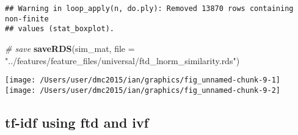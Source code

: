 \documentclass[10pt]{report}
\newenvironment{Shaded}{}{}
\newcommand{\KeywordTok}[1]{\textcolor[rgb]{0.00,0.44,0.13}{\textbf{{#1}}}}
\newcommand{\DataTypeTok}[1]{\textcolor[rgb]{0.56,0.13,0.00}{{#1}}}
\newcommand{\StringTok}[1]{\textcolor[rgb]{0.25,0.44,0.63}{{#1}}}
\newcommand{\CommentTok}[1]{\textcolor[rgb]{0.38,0.63,0.69}{\textit{{#1}}}}
\newcommand{\NormalTok}[1]{{#1}}
\begin{document}
\begin{Shaded}
\end{Shaded}

\begin{verbatim}
## Warning in loop_apply(n, do.ply): Removed 13870 rows containing non-finite
## values (stat_boxplot).
\end{verbatim}

\begin{Shaded}
\begin{Highlighting}[]
\CommentTok{# save}
\KeywordTok{saveRDS}\NormalTok{(sim_mat, }\DataTypeTok{file =} \StringTok{"../features/feature_files/universal/ftd_lnorm_similarity.rds"}\NormalTok{)}
\end{Highlighting}
\end{Shaded}

\begin{center}\texttt{[image: /Users/user/dmc2015/ian/graphics/fig\_unnamed-chunk-9-1]} \texttt{[image: /Users/user/dmc2015/ian/graphics/fig\_unnamed-chunk-9-2]} \end{center}

\subsection{tf-idf using ftd and ivf}\label{tf-idf-using-ftd-and-ivf}

\begin{Shaded}
\end{Shaded}
\end{document}
